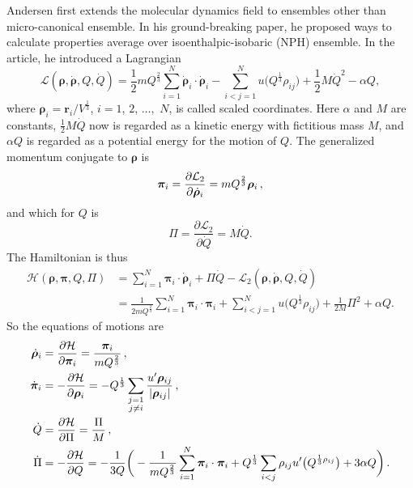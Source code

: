 Andersen first extends the molecular dynamics field to
ensembles other than micro-canonical ensemble.\cite{Andersen:1980ew}
In his ground-breaking paper, he proposed ways to calculate properties average
over isoenthalpic-isobaric (NPH) ensemble. In the article, he introduced
a Lagrangian
\begin{equation}\label{eq:andersenlagrang}
	\mathcal{L}(\bm{\rho}, \dot{\bm{\rho}}, Q, \dot{ Q }) = \frac{ 1 }{ 2 } m
	Q^{\frac{ 2 }{ 3 }}
	\sum_{i=1}^{N} \dot{ \bm{\rho} }_i \cdot \dot{ \bm{\rho} }_i - \sum_{i<j=1}^{N}
	u \big(Q^{\frac{ 1 }{ 3 }} \rho_{ij} \big) + \frac{ 1 }{ 2 } M \dot{ Q } ^2 -
	\alpha Q,
\end{equation}
where $\bm{\rho}_i = \bm{r}_i / V ^{\frac{ 1 }{ 3 }}$, $i=1$, $2$, $\ldots$,~$N$,
is called scaled coordinates. Here $\alpha$ and $M$ are constants,
$\frac{ 1 }{ 2 } M \dot{ Q }$ now is regarded as a kinetic energy with fictitious
mass $M$,
and $\alpha Q$ is regarded as a potential energy for the motion of $Q$.
The generalized momentum conjugate to $\bm{\rho}$ is
\begin{equation}
	\bm{\pi}_i = \frac{ \partial \mathcal{L}_2 }{ \partial \dot{ \bm{\rho} }_i } =
	m Q^{\frac{ 2 }{ 3 }} \bm{\rho}_i \thinspace,
\end{equation}
and which for $Q$ is
\begin{equation}
	\Pi = \frac{ \partial \mathcal{L}_2 }{ \partial \dot{Q} } = M \dot{ Q }.
\end{equation}
The Hamiltonian is thus
\begin{equation}
	\begin{split}
		\mathcal{H}(\bm{\rho}, \bm{\pi}, Q, \Pi) &= \sum_{i=1}^{N} \bm{\pi}_i \cdot
		\dot{ \bm{\rho} }_i + \Pi \dot{ Q } - \mathcal{L}_2
		(\bm{\rho}, \dot{\bm{\rho}}, Q, \dot{ Q })\\
		&= \frac{ 1 }{ 2 m Q^{\frac{ 2 }{ 3 }} }
		\sum_{i=1}^{N} \bm{\pi}_i \cdot \bm{\pi}_i
		+ \sum_{i<j=1}^{N} u\big(Q^{\frac{ 1 }{ 3 }} \rho_{ij}\big) + \frac{ 1 }{ 2 M }
		\Pi^2 + \alpha Q.
	\end{split}
\end{equation}
So the equations of motions are
\begin{align}
	\dot{ \bm{\rho} }_i & = \frac{ \partial \mathcal{H} }{ \partial \bm{\pi}_i } =
	\frac{ \bm{\pi}_i }{ m Q^{\frac{ 2 }{ 3 }} } \thinspace,                          \\
	\dot{ \bm{\pi} }_i  & = - \frac{ \partial \mathcal{H} }{ \partial \bm{\rho}_i } =
	- Q^{\frac{ 1 }{ 3 }} \sum_{\substack{j=1                                         \\j\neq i}}
	\frac{ u' \bm{\rho}_{ij} }{ \lvert \bm{\rho}_{ij} \rvert  } \thinspace,           \\
	\dot{ Q }           & = \frac{ \partial \mathcal{H} }{ \partial \Pi } =
	\frac{ \Pi }{ M } \thinspace,                                                     \\
	\dot{ \Pi }         & = - \frac{ \partial \mathcal{H} }{ \partial Q } =
	- \frac{ 1 }{ 3Q } \bigg(
	- \frac{ 1 }{ m Q^{\frac{ 2 }{ 3 }} }	\sum_{i=1}^{N} \bm{\pi}_i \cdot \bm{\pi}_i
	+ Q^{\frac{ 1 }{ 3 }} \sum_{i<j} \rho_{ij} u'\big(Q^{\frac{ 1 }{ 3 } \rho_{ij}}\big) +
	3 \alpha Q
	\bigg) \thinspace.
\end{align}
